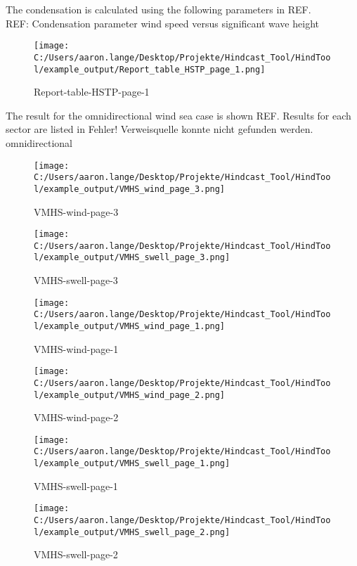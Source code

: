 The condensation is calculated using the following parameters in REF.\\
REF: Condensation parameter wind speed versus significant wave height
 
\begin{figure}[H] 
 \centering 
 \texttt{[image: C:/Users/aaron.lange/Desktop/Projekte/Hindcast\_Tool/HindTool/example\_output/Report\_table\_HSTP\_page\_1.png]} 
 \captionsetup{type=table} 
\caption{ Report-table-HSTP-page-1 } 
 \label{tab: Report_table_HSTP_page_1 } 
\end{figure}

The result for the omnidirectional wind sea case is shown REF. Results for each sector are listed in Fehler! Verweisquelle konnte nicht gefunden werden.\\
omnidirectional\\

\begin{figure}[H] 
 \centering 
 \texttt{[image: C:/Users/aaron.lange/Desktop/Projekte/Hindcast\_Tool/HindTool/example\_output/VMHS\_wind\_page\_3.png]} 
 \caption{ VMHS-wind-page-3 } 
 \label{fig: VMHS_wind_page_3 } 
\end{figure}
\begin{figure}[H] 
 \centering 
 \texttt{[image: C:/Users/aaron.lange/Desktop/Projekte/Hindcast\_Tool/HindTool/example\_output/VMHS\_swell\_page\_3.png]} 
 \caption{ VMHS-swell-page-3 } 
 \label{fig: VMHS_swell_page_3 } 
\end{figure}

\begin{figure}[H] 
 \centering 
 \texttt{[image: C:/Users/aaron.lange/Desktop/Projekte/Hindcast\_Tool/HindTool/example\_output/VMHS\_wind\_page\_1.png]} 
 \caption{ VMHS-wind-page-1 } 
 \label{fig: VMHS_wind_page_1 } 
\end{figure}
\begin{figure}[H] 
 \centering 
 \texttt{[image: C:/Users/aaron.lange/Desktop/Projekte/Hindcast\_Tool/HindTool/example\_output/VMHS\_wind\_page\_2.png]} 
 \caption{ VMHS-wind-page-2 } 
 \label{fig: VMHS_wind_page_2 } 
\end{figure}

\begin{figure}[H] 
 \centering 
 \texttt{[image: C:/Users/aaron.lange/Desktop/Projekte/Hindcast\_Tool/HindTool/example\_output/VMHS\_swell\_page\_1.png]} 
 \caption{ VMHS-swell-page-1 } 
 \label{fig: VMHS_swell_page_1 } 
\end{figure}
\begin{figure}[H] 
 \centering 
 \texttt{[image: C:/Users/aaron.lange/Desktop/Projekte/Hindcast\_Tool/HindTool/example\_output/VMHS\_swell\_page\_2.png]} 
 \caption{ VMHS-swell-page-2 } 
 \label{fig: VMHS_swell_page_2 } 
\end{figure}


